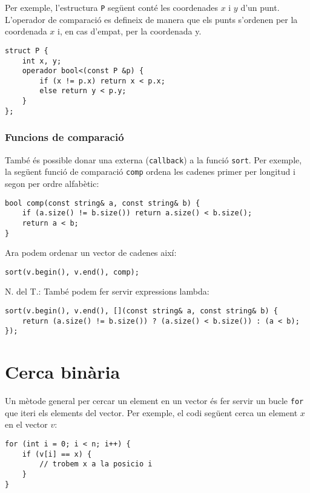 Per exemple, l'estructura \texttt{P} següent
conté les coordenades $x$ i $y$ d'un punt.
L'operador de comparació es defineix de manera que
els punts s'ordenen per la coordenada $x$
i, en cas d'empat, per la coordenada y.

\begin{lstlisting}
struct P {
    int x, y;
    operador bool<(const P &p) {
        if (x != p.x) return x < p.x;
        else return y < p.y;
    }
};
\end{lstlisting}

\subsubsection{Funcions de comparació}


També és possible donar una
 externa (\texttt{callback}) a la funció
\texttt{sort}. 
Per exemple, la següent funció de comparació \texttt{comp}
ordena les cadenes primer per longitud i segon per ordre alfabètic:

\begin{lstlisting}
bool comp(const string& a, const string& b) {
    if (a.size() != b.size()) return a.size() < b.size();
    return a < b;
}
\end{lstlisting}
Ara podem ordenar un vector de cadenes així:
\begin{lstlisting}
sort(v.begin(), v.end(), comp);
\end{lstlisting}

N. del T.: També podem fer servir expressions lambda:
\begin{lstlisting}
sort(v.begin(), v.end(), [](const string& a, const string& b) {
    return (a.size() != b.size()) ? (a.size() < b.size()) : (a < b);
});
\end{lstlisting}

\section{Cerca binària}


Un mètode general per cercar un element
en un vector és fer servir un bucle \texttt{for}
que iteri els elements del vector.
Per exemple, el codi següent cerca
un element $x$ en el vector $v$:

\begin{lstlisting}
for (int i = 0; i < n; i++) {
    if (v[i] == x) {
        // trobem x a la posicio i
    }
}
\end{lstlisting}

